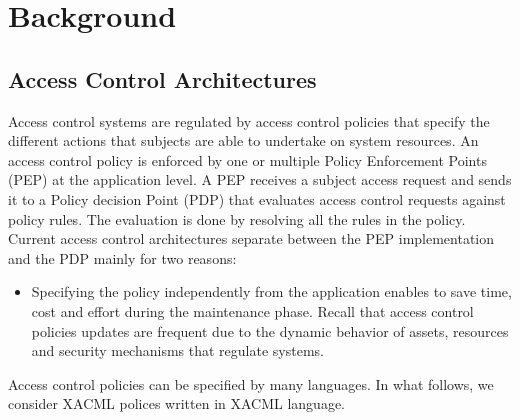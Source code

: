







\section{Background}
\label{sec:background}
\subsection{Access Control Architectures}
Access control systems are regulated by access control policies that specify the different actions that subjects are able to undertake on system resources. 
An access control policy is enforced by one or multiple Policy Enforcement Points (PEP) at the application level. A PEP receives a subject access request and 
sends it to a Policy decision Point (PDP) that evaluates access control requests against policy rules. The evaluation is done by resolving all the rules in the policy. 
Current access control architectures separate between the PEP implementation and the PDP mainly for two reasons:
\begin{itemize}
\item Specifying the policy independently from the application enables to save time, cost and effort during the maintenance phase. 
Recall that access control policies updates are frequent due to the dynamic behavior of assets, resources and security mechanisms that regulate systems.
\end{itemize}
Access control policies can be specified by many languages. In what follows, we consider XACML polices written in XACML language.

